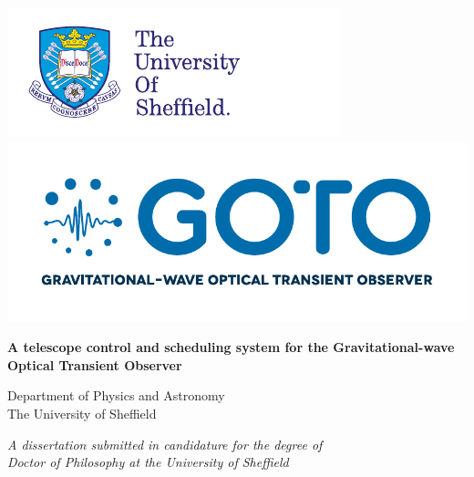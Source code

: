 \begin{center}
    \includegraphics[width=0.45\linewidth]{./images/UoS_logo.pdf}
    \includegraphics[width=0.45\linewidth]{./images/GOTO_logo.pdf}

    \vspace*{2.5cm}

    \begin{Huge}
        \textbf{A telescope control and
               scheduling system for the
               Gravitational-wave Optical Transient Observer
               }
    \end{Huge}

    \vspace*{2.5cm}

    \begin{LARGE}
    \end{LARGE}

    \vspace*{1cm}

    \begin{Large}
        Department of Physics and Astronomy \\
        \smallskip
        The University of Sheffield
    \end{Large}



    \vspace*{2.5cm}

    \begin{large}
        \textit{A dissertation submitted in candidature for the degree of} \\
        \textit{Doctor of Philosophy at the University of Sheffield}
    \end{large}

    \vspace*{1cm}

    \begin{large}
    \end{large}

    \vfill
\end{center}
